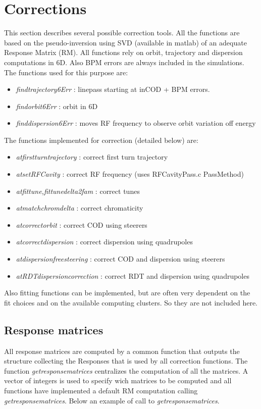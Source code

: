 \clearpage
\section{Corrections}
This section describes several possible correction tools. All the functions are based on the pseudo-inversion using SVD (available in matlab) of an adequate Response Matrix (RM). 
All functions rely on orbit, trajectory and dispersion computations in 6D. Also BPM errors are always included in the simulations. The functions used for this purpose are: 
\begin{itemize}
\item \emph{findtrajectory6Err} : linepass starting at inCOD + BPM errors.
\item \emph{findorbit6Err} : orbit in 6D
\item \emph{finddispersion6Err} : moves RF frequency to observe orbit variation off energy
\end{itemize}

The functions implemented for correction (detailed below) are:
\begin{itemize}
\item \emph{atfirstturntrajectory} : correct first turn trajectory
\item \emph{atsetRFCavity} : correct RF frequency (uses RFCavityPass.c PassMethod)
\item \emph{atfittune,fittunedelta2fam} : correct tunes
\item \emph{atmatchchromdelta} : correct chromaticity
\item \emph{atcorrectorbit} : correct COD using steerers
\item \emph{atcorrectdispersion} : correct dispersion using quadrupoles
\item \emph{atdispersionfreesteering} : correct COD and dispersion using steerers
\item \emph{atRDTdispersioncorrection} : correct RDT and dispersion using quadrupoles
\end{itemize}
 
Also fitting functions can be implemented, but are often very dependent on the fit choices and on the available computing clusters. So they are not included here. 

\clearpage
\subsection{Response matrices}
All response matrices are computed by a common function that outputs the structure collecting the Responses that is used by all correction functions. The function \emph{getresponsematrices} centralizes the computation of all the matrices. A vector of integers is used to specify wich matrices to be computed and all functions have implemented a default RM computation calling \emph{getresponsematrices}. Below an example of call to \emph{getresponsematrices}.

